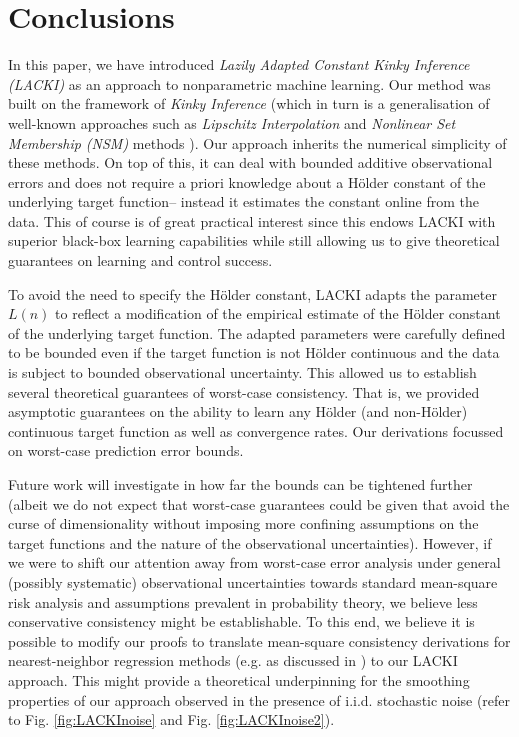\documentclass{article} %
\theoremstyle{definition}
\theoremstyle{remark}
\begin{document}
%

\section{Conclusions}
\label{sec:concl}
In this paper, we have introduced \emph{Lazily Adapted Constant Kinky Inference (LACKI)} as an approach to nonparametric machine learning. Our method was built on the framework of \emph{Kinky Inference} (which in turn is a generalisation of well-known approaches such as \emph{Lipschitz Interpolation} \cite{Sukharev1978,Zabinsky2003,Beliakov2006} and \emph{Nonlinear Set Membership (NSM)}  methods \cite{Milanese2004}). 
 Our approach inherits the numerical simplicity of these methods. On top of this, it can deal with bounded additive observational errors and does not require a priori knowledge about a H\"older constant of the underlying target function--  instead it estimates the constant online from the data. This of course is of great practical interest since this endows LACKI with superior black-box learning capabilities while still allowing us to give theoretical guarantees on learning and control success.
 
To avoid the need to specify the H\"older constant, LACKI adapts the parameter $L(n)$ to reflect a modification of the empirical estimate of the H\"older constant of the underlying target function. 
The adapted parameters were carefully defined to be bounded even if the target function is not H\"older continuous and the data is subject to bounded observational uncertainty.
This allowed us to establish several theoretical guarantees of worst-case consistency. That is, we provided asymptotic guarantees on the ability to learn any H\"older (and non-H\"older) continuous target function as well as convergence rates. Our derivations focussed on worst-case prediction error bounds.

Future work will investigate in how far the bounds can be tightened further (albeit we do not expect that worst-case guarantees could be given that avoid the curse of dimensionality without imposing more confining assumptions on the target functions and the nature of the observational uncertainties). 
However, if we were to shift our attention away from worst-case error analysis under general (possibly systematic) observational uncertainties towards standard mean-square risk analysis and assumptions prevalent in probability theory, we believe less conservative consistency might be establishable. 
To this end, we believe it is possible to modify our proofs to translate mean-square consistency derivations for nearest-neighbor regression methods (e.g. as discussed in \cite{Gyoerfi2002}) to our LACKI approach. This might provide a theoretical underpinning for the smoothing properties of our approach observed in the presence of i.i.d. stochastic noise (refer to Fig. \ref{fig:LACKInoise} and Fig. \ref{fig:LACKInoise2}). 
\end{document}
